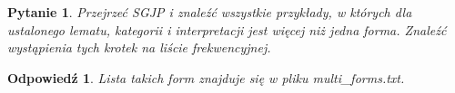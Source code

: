\documentclass{article}
\newcommand{\form}{{\it form}}
\newcommand{\lemma}{{\it lemma}}
\newcommand{\cat}{{\it cat}}
\newcommand{\interp}{{\it interp}}
\newcommand{\fsuf}{{\it fsuf}}
\newcommand{\lsuf}{{\it lsuf}}
\newtheorem{task}{Pytanie}
\newtheorem{answer}{Odpowiedź}
\begin{document}
\begin{task}
Przejrzeć SGJP i znaleźć wszystkie przykłady, w których dla ustalonego lematu, kategorii i interpretacji
jest więcej niż jedna forma. Znaleźć wystąpienia tych krotek na liście frekwencyjnej.
\end{task}

\begin{answer}
Lista takich form znajduje się w pliku multi\_forms.txt.
\end{answer}

% 
% 
% 
% 
% 
% 
% 
% 
% 
\end{document}
